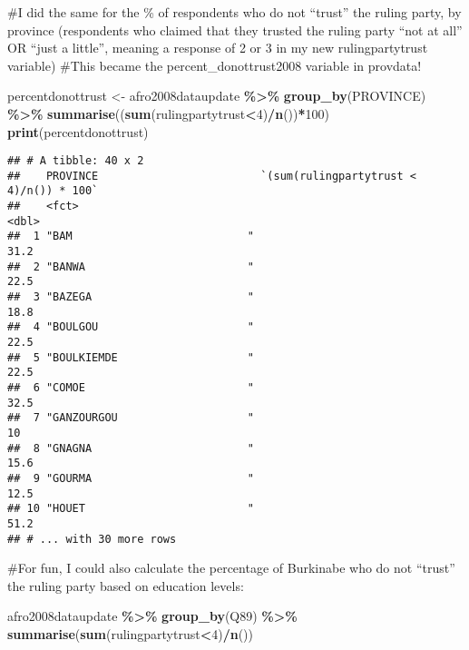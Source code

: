 \documentclass[]{article}
\newenvironment{Shaded}{\begin{snugshade}}{\end{snugshade}}
\newcommand{\DecValTok}[1]{\textcolor[rgb]{0.00,0.00,0.81}{#1}}
\newcommand{\KeywordTok}[1]{\textcolor[rgb]{0.13,0.29,0.53}{\textbf{#1}}}
\newcommand{\NormalTok}[1]{#1}
\newcommand{\OperatorTok}[1]{\textcolor[rgb]{0.81,0.36,0.00}{\textbf{#1}}}
\newcommand{\StringTok}[1]{\textcolor[rgb]{0.31,0.60,0.02}{#1}}
\begin{document}
\#I did the same for the \% of respondents who do not ``trust'' the
ruling party, by province (respondents who claimed that they trusted the
ruling party ``not at all'' OR ``just a little'', meaning a response of
2 or 3 in my new rulingpartytrust variable) \#This became the
percent\_donottrust2008 variable in provdata!

\begin{Shaded}
\begin{Highlighting}[]
\NormalTok{percentdonottrust <{-}}\StringTok{ }\NormalTok{afro2008dataupdate }\OperatorTok{\%>\%}
\StringTok{  }\KeywordTok{group\_by}\NormalTok{(PROVINCE) }\OperatorTok{\%>\%}
\StringTok{  }\KeywordTok{summarise}\NormalTok{((}\KeywordTok{sum}\NormalTok{(rulingpartytrust}\OperatorTok{<}\DecValTok{4}\NormalTok{)}\OperatorTok{/}\KeywordTok{n}\NormalTok{())}\OperatorTok{*}\DecValTok{100}\NormalTok{)}
\KeywordTok{print}\NormalTok{(percentdonottrust)}
\end{Highlighting}
\end{Shaded}

\begin{verbatim}
## # A tibble: 40 x 2
##    PROVINCE                         `(sum(rulingpartytrust < 4)/n()) * 100`
##    <fct>                                                              <dbl>
##  1 "BAM                           "                                    31.2
##  2 "BANWA                         "                                    22.5
##  3 "BAZEGA                        "                                    18.8
##  4 "BOULGOU                       "                                    22.5
##  5 "BOULKIEMDE                    "                                    22.5
##  6 "COMOE                         "                                    32.5
##  7 "GANZOURGOU                    "                                    10  
##  8 "GNAGNA                        "                                    15.6
##  9 "GOURMA                        "                                    12.5
## 10 "HOUET                         "                                    51.2
## # ... with 30 more rows
\end{verbatim}

\#For fun, I could also calculate the percentage of Burkinabe who do not
``trust'' the ruling party based on education levels:

\begin{Shaded}
\begin{Highlighting}[]
\NormalTok{afro2008dataupdate }\OperatorTok{\%>\%}
\StringTok{  }\KeywordTok{group\_by}\NormalTok{(Q89) }\OperatorTok{\%>\%}
\StringTok{  }\KeywordTok{summarise}\NormalTok{(}\KeywordTok{sum}\NormalTok{(rulingpartytrust}\OperatorTok{<}\DecValTok{4}\NormalTok{)}\OperatorTok{/}\KeywordTok{n}\NormalTok{())}
\end{Highlighting}
\end{Shaded}
\end{document}
